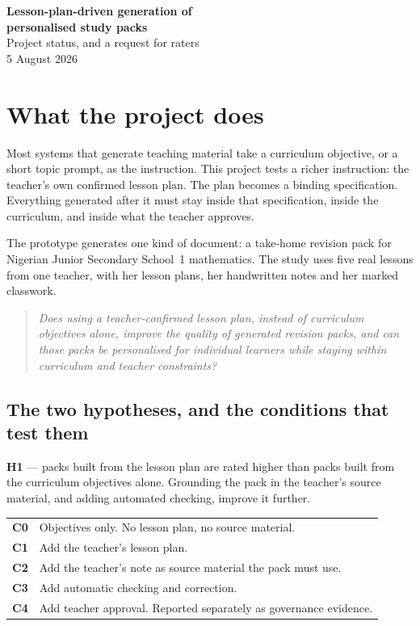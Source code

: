 \documentclass[11pt,a4paper]{article}
\newcommand{\q}[1]{\begin{quote}\itshape #1\end{quote}}
\begin{document}
\begin{center}
{\LARGE\bfseries Lesson-plan-driven generation of\\personalised study packs}\\[6pt]
{\large Project status, and a request for raters}\\[4pt]
{\normalsize 5 August 2026}
\end{center}
\vspace{4pt}

\section{What the project does}

Most systems that generate teaching material take a curriculum objective, or a short topic
prompt, as the instruction. This project tests a richer instruction: the teacher's own
confirmed lesson plan. The plan becomes a binding specification. Everything generated after
it must stay inside that specification, inside the curriculum, and inside what the teacher
approves.

The prototype generates one kind of document: a take-home revision pack for Nigerian
Junior Secondary School~1 mathematics. The study uses five real lessons from one teacher,
with her lesson plans, her handwritten notes and her marked classwork.

\q{Does using a teacher-confirmed lesson plan, instead of curriculum objectives alone,
improve the quality of generated revision packs, and can those packs be personalised for
individual learners while staying within curriculum and teacher constraints?}

\subsection{The two hypotheses, and the conditions that test them}

\textbf{H1} — packs built from the lesson plan are rated higher than packs built from the
curriculum objectives alone. Grounding the pack in the teacher's source material, and
adding automated checking, improve it further.

\begin{center}
\begin{tabular}{@{}ll@{}}
\toprule
\textbf{C0} & Objectives only. No lesson plan, no source material.\\
\textbf{C1} & Add the teacher's lesson plan.\\
\textbf{C2} & Add the teacher's note as source material the pack must use.\\
\textbf{C3} & Add automatic checking and correction.\\
\textbf{C4} & Add teacher approval. Reported separately as governance evidence.\\
\bottomrule
\end{tabular}
\end{center}
\end{document}
